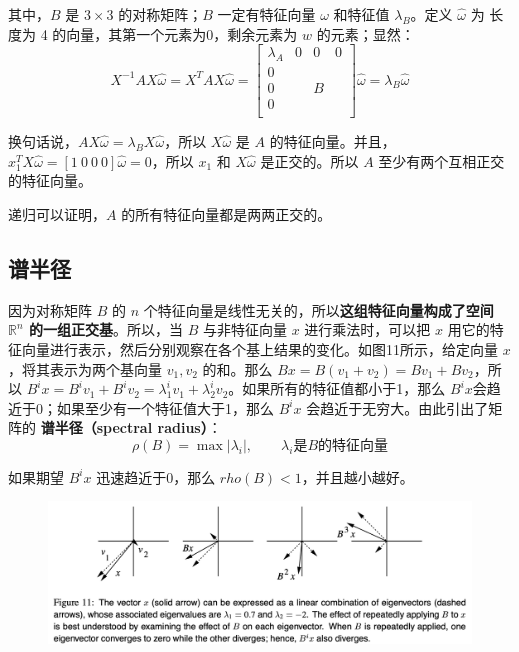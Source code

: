 \documentclass[12pt]{article}
\begin{document}
\begin{framed}
其中，$B$ 是 $3 \times 3$ 的对称矩阵；$B$ 一定有特征向量 $\omega$ 和特征值 $\lambda_B$。定义 $\hat{\omega}$ 为 长度为 4 的向量，其第一个元素为0，剩余元素为 $w$ 的元素；显然：
$$
X^{-1}AX\hat{\omega} = X^TAX\hat{\omega} = \begin{bmatrix}
\lambda_A & 0 & 0 & 0 \\
0 & & & \\
0 & & B & \\
0 & & & \\
\end{bmatrix} \hat{\omega} = \lambda_B\hat{\omega}
$$

换句话说，$AX\hat{\omega} = \lambda_BX\hat{\omega}$，所以 $X\hat{\omega}$ 是 $A$ 的特征向量。并且，$x_1^TX\hat{\omega} = [1 \ 0 \ 0 \  0]\hat{\omega} = 0$，所以 $x_1$ 和 $X\hat{\omega}$ 是正交的。所以 $A$ 至少有两个互相正交的特征向量。

递归可以证明，$A$ 的所有特征向量都是两两正交的。
\end{framed}
 
\subsection{谱半径}
因为对称矩阵 $B$ 的 $n$ 个特征向量是线性无关的，所以\textbf{这组特征向量构成了空间 $\mathbb{R}^n$ 的一组正交基}。所以，当 $B$ 与非特征向量 $x$ 进行乘法时，可以把 $x$ 用它的特征向量进行表示，然后分别观察在各个基上结果的变化。如图11所示，给定向量 $x$，将其表示为两个基向量 $v_1, v_2$ 的和。那么 $Bx = B(v_1 + v_2) = Bv_1 + Bv_2$，所以 $B^ix = B^iv_1 + B^iv_2 = \lambda^i_1 v_1 + \lambda^i_2 v_2$。如果所有的特征值都小于1，那么 $B^ix$会趋近于0；如果至少有一个特征值大于1，那么 $B^ix$ 会趋近于无穷大。由此引出了矩阵的 \textbf{谱半径（spectral radius）}：
 $$
 \rho (B) = \max|\lambda_i|, \qquad \lambda_i\text{是} B \text{的特征向量}
 $$
 
 如果期望 $B^ix$ 迅速趋近于0，那么 $rho(B) < 1$，并且越小越好。
 \begin{figure}[H]
    \centering
    \includegraphics[width=1\textwidth]{fig/CG_Plot_Eightvalue_3.png}
\end{figure}
\end{document}
